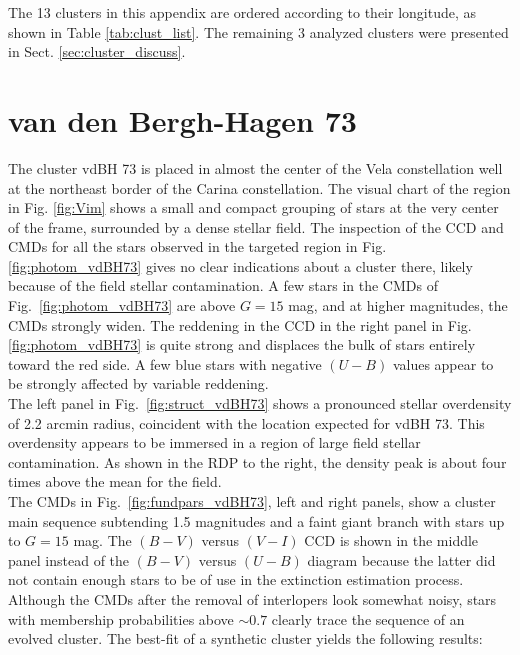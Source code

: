 \documentclass[draft]{aa}
\begin{document}
\appendix

The 13 clusters in this appendix are ordered according to their
longitude, as shown in Table \ref{tab:clust_list}. The remaining 3
analyzed clusters were presented in Sect. \ref{sec:cluster_discuss}.


\section{van den Bergh-Hagen 73}

The cluster vdBH 73 is placed in almost the center of the Vela
constellation well at the northeast border of the Carina constellation. The
visual chart of the region in Fig. \ref{fig:Vim} shows a small and compact
grouping of stars at the very center of the frame, surrounded by a dense stellar
field.
The inspection of the CCD and CMDs for all the stars observed
in the targeted region in Fig. \ref{fig:photom_vdBH73} gives no clear
indications about a cluster there, likely because of the field stellar contamination.
A few stars in the CMDs of Fig.~\ref{fig:photom_vdBH73} are above $G=15$
mag, and at higher magnitudes, the CMDs strongly widen.
The reddening in the CCD in the right panel in Fig. \ref{fig:photom_vdBH73} is quite
strong and displaces the bulk of stars entirely toward the red side. A
few blue stars with negative $(U-B)$ values appear to be strongly affected by
variable reddening.\\

The left panel in Fig.~\ref{fig:struct_vdBH73} shows a pronounced stellar
overdensity of 2.2 arcmin radius, coincident with the location expected for
vdBH 73. This overdensity appears to be immersed in a region of large field
stellar contamination. As shown in the RDP to the right, the density peak is about
four times above the mean for the field.\\

The CMDs in Fig.~\ref{fig:fundpars_vdBH73}, left and right panels, show a cluster main sequence subtending 1.5 magnitudes and a faint giant
branch with stars up to $G=15$ mag.
The $(B-V)$ versus $(V-I)$ CCD is shown in the middle panel instead of the
$(B-V)$ versus $(U-B)$ diagram because the latter did not contain enough stars to
be of use in the extinction estimation process.
Although the CMDs after the removal of interlopers look somewhat noisy, stars with membership probabilities above $\sim0.7$ clearly
trace the sequence of an evolved cluster.
The best-fit of a synthetic cluster yields the following results:
\end{document}
